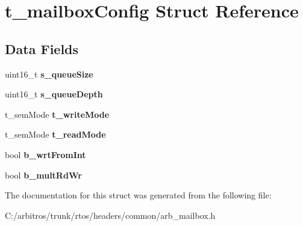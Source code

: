 \hypertarget{structt__mailbox_config}{\section{t\-\_\-mailbox\-Config Struct Reference}
\label{structt__mailbox_config}
}
\subsection*{Data Fields}
\begin{DoxyCompactItemize}
\item 
\hypertarget{structt__mailbox_config_a5f69c635dea1a6b7fdcc4f4930fb3fe3}{uint16\-\_\-t {\bfseries s\-\_\-queue\-Size}}\label{structt__mailbox_config_a5f69c635dea1a6b7fdcc4f4930fb3fe3}

\item 
\hypertarget{structt__mailbox_config_a07e90e2e1a8032b361dcdc6e281a06f3}{uint16\-\_\-t {\bfseries s\-\_\-queue\-Depth}}\label{structt__mailbox_config_a07e90e2e1a8032b361dcdc6e281a06f3}

\item 
\hypertarget{structt__mailbox_config_a6a280a171688e3dd25d9a5d86cbbf3c5}{t\-\_\-sem\-Mode {\bfseries t\-\_\-write\-Mode}}\label{structt__mailbox_config_a6a280a171688e3dd25d9a5d86cbbf3c5}

\item 
\hypertarget{structt__mailbox_config_a0605d9ce204d758b101f7420a464525a}{t\-\_\-sem\-Mode {\bfseries t\-\_\-read\-Mode}}\label{structt__mailbox_config_a0605d9ce204d758b101f7420a464525a}

\item 
\hypertarget{structt__mailbox_config_a9569db233967649615e97d1c48b4f647}{bool {\bfseries b\-\_\-wrt\-From\-Int}}\label{structt__mailbox_config_a9569db233967649615e97d1c48b4f647}

\item 
\hypertarget{structt__mailbox_config_a8ff60f9cd04293676351efc2b4f6cf5c}{bool {\bfseries b\-\_\-mult\-Rd\-Wr}}\label{structt__mailbox_config_a8ff60f9cd04293676351efc2b4f6cf5c}

\end{DoxyCompactItemize}


The documentation for this struct was generated from the following file\-:\begin{DoxyCompactItemize}
\item 
C\-:/arbitros/trunk/rtos/headers/common/arb\-\_\-mailbox.\-h\end{DoxyCompactItemize}
